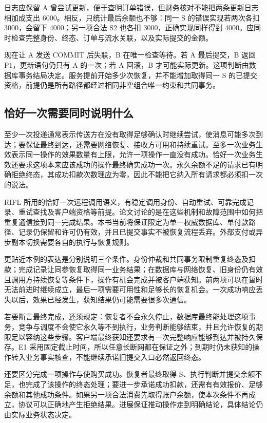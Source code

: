 日志应保留 A 曾尝试更新，便于查明订单错误，但财务核对不能把两条更新日志相加成支出 6000。相反，只统计最后余额也不够：同一 S 的错误实现若两次各扣 3000，会留下 4000；另一项合法 S2 也各扣 3000，正确实现同样得到 4000。应同时检查完整身份、终态、订单与流水关联，以及实际提交的金额。

现在让 A 发送 COMMIT 后失联，B 在唯一检查等待。若 A 最后提交，B 返回 P1，更新语句仍只有 A 的一次；若 A 回滚，B 才可能实际更新。这项判断由数据库事务结局决定。服务提前开始多少次恢复，并不能增加取得同一 S 的已提交资格，前提仍是所有路径都经过相同非空组合唯一约束和共同事务。

\subsection*{恰好一次需要同时说明什么}

至少一次投递通常表示传送方在没有取得足够确认时继续尝试，使消息可能多次到达；要保证最终到达，还需要网络恢复、接收方可用和持续重试。至多一次业务生效表示同一操作的效果数量有上限，允许一项操作一直没有成功。恰好一次业务生效还要求这项本来应该成功的操作最终确实成功一次。永久余额不足的请求已有明确拒绝终态，其成功扣款次数理应为零，因此不能把它纳入所有请求都必须扣一次的说法。

RIFL 所用的恰好一次远程调用语义，有稳定调用身份、自动重试、可靠完成记录、重试查找及客户端资格等前提。论文讨论的是在这些机制和故障范围中如何把重复通信接到同一完成结果\cite{rifl}。本书当前将保证限定为单一权威数据库、单付款路径、记录仍保留和许可仍有效，并且已提交事实不被恢复流程丢弃。外部支付或异步副本切换需要各自的执行与恢复规则。

更贴近本例的表达是分别说明三个条件。身份仲裁和共同事务限制重复终态及扣款；完成记录让同参恢复取得同一业务结果；在数据库与网络恢复、旧身份仍有效且调用方持续恢复等条件下，操作有机会完成并被客户端获知。前两项可以在暂时无法前进时继续成立，最后一项需要可用性和足够长的恢复机会。一次成功响应丢失以后，效果已经发生，获知结果仍可能需要很多次通信。

若要断言最终完成，还须规定：恢复者不会永久停止，数据库最终能处理这项事务，竞争与调度不会使它永久等不到执行，业务判断能够结束，并且允许恢复的期限足以容纳这些步骤。客户端最终获知还要求有一次完整响应能够到达并被持久保存。E1 采用固定截止时间，所以任意长断网都在保证之外；到期时仍未获知的操作转入业务事实核查，不能继续承诺旧提交入口必然返回终态。

还要区分完成一项操作与使购买成功。恢复者最终取得 S、执行判断并提交余额不足，也完成了该操作的终态处理；要进一步承诺成功扣款，还需有有效报价、足够余额和其他成功条件。如果另一项合法消费先取得账户余额，使本次条件不再成立，协议可以正确地产生拒绝结果。进展保证推动操作走到明确结论，具体结论仍由实际业务状态决定。

